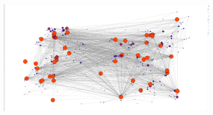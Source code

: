 \begin{figure}[H]
	\centering
	\includegraphics[width=1\linewidth]{force}
	\caption{}
	\label{fig:force}
\end{figure}

